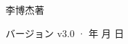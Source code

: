 \begin{titlepage}
\vfill
{\LARGE\sffamily 李博杰\quad 著\par}
\vspace{0.7cm}
{\small\sffamily\color{structurecolor!80} バージョン v3.0 · \number\year 年 \number\month 月 \number\day 日\par}
\vspace{1.2cm}
\end{titlepage}
